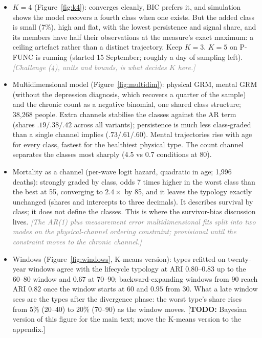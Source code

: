 \documentclass[11pt]{article}
\newcommand{\todo}[1]{\textcolor{red!75!black}{[\textbf{TODO:} #1]}}
\newcommand{\note}[1]{\textcolor{gray}{\textit{[#1]}}}
\begin{document}
\begin{itemize}
\item $K=4$ (Figure~\ref{fig:k4}): converges cleanly, BIC prefers it, and simulation shows the model recovers a fourth class when one exists. But the added class is small (7\%), high and flat, with the lowest persistence and signal share, and its members have half their observations at the measure's exact maximum: a ceiling artefact rather than a distinct trajectory. Keep $K=3$. $K=5$ on P-FUNC is running (started 15 September; roughly a day of sampling left). \note{Challenge (4), units and bounds, is what decides $K$ here.}
\item Multidimensional model (Figure~\ref{fig:multidim}): physical GRM, mental GRM (without the depression diagnosis, which recovers a quarter of the sample) and the chronic count as a negative binomial, one shared class structure; 38,268 people. Extra channels stabilise the classes against the AR term (shares $.19/.38/.42$ across all variants); persistence is much less class-graded than a single channel implies ($.73/.61/.60$). Mental trajectories rise with age for every class, fastest for the healthiest physical type. The count channel separates the classes most sharply (4.5 vs 0.7 conditions at 80).
\item Mortality as a channel (per-wave logit hazard, quadratic in age; 1,996 deaths): strongly graded by class, odds 7 times higher in the worst class than the best at 55, converging to $2.4\times$ by 85, and it leaves the typology exactly unchanged (shares and intercepts to three decimals). It describes survival by class; it does not define the classes. This is where the survivor-bias discussion lives. \note{The AR(1) plus measurement error multidimensional fits split into two modes on the physical-channel ordering constraint; provisional until the constraint moves to the chronic channel.}
\item Windows (Figure~\ref{fig:windows}, K-means version): types refitted on twenty-year windows agree with the lifecycle typology at ARI $0.80$--$0.83$ up to the 60--80 window and $0.67$ at 70--90; backward-expanding windows from 90 reach ARI $0.82$ once the window starts at 60 and $0.95$ from 30. What a late window sees are the types after the divergence phase: the worst type's share rises from 5\% (20--40) to 20\% (70--90) as the window moves. \todo{Bayesian version of this figure for the main text; move the K-means version to the appendix.}
\end{itemize}
\end{document}
